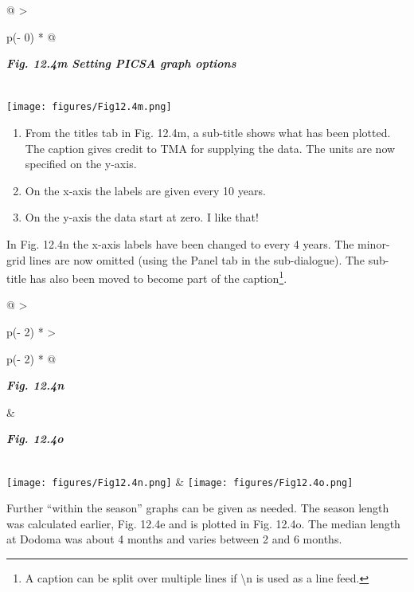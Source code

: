 \documentclass[
  letterpaper,
  DIV=11,
  numbers=noendperiod]{scrreprt}
\begin{document}
\begin{longtable}[]{@{}
  >{\raggedright\arraybackslash}p{(\columnwidth - 0\tabcolsep) * }@{}}
\toprule\noalign{}
\begin{minipage}[b]{\linewidth}\raggedright
\textbf{\emph{Fig. 12.4m Setting PICSA graph options}}
\end{minipage} \\
\midrule\noalign{}
\endhead
\bottomrule\noalign{}
\endlastfoot
\texttt{[image: figures/Fig12.4m.png]} \\
\end{longtable}

\begin{enumerate}
\def\labelenumi{\arabic{enumi})}
\item
  From the titles tab in Fig. 12.4m, a sub-title shows what has been
  plotted. The caption gives credit to TMA for supplying the data. The
  units are now specified on the y-axis.
\item
  On the x-axis the labels are given every 10 years.
\item
  On the y-axis the data start at zero. I like that!
\end{enumerate}

In Fig. 12.4n the x-axis labels have been changed to every 4 years. The
minor-grid lines are now omitted (using the Panel tab in the
sub-dialogue). The sub-title has also been moved to become part of the
caption\footnote{A caption can be split over multiple lines if
  \textbackslash n is used as a line feed.}.

\begin{longtable}[]{@{}
  >{\raggedright\arraybackslash}p{(\columnwidth - 2\tabcolsep) * }
  >{\raggedright\arraybackslash}p{(\columnwidth - 2\tabcolsep) * }@{}}
\toprule\noalign{}
\begin{minipage}[b]{\linewidth}\raggedright
\textbf{\emph{Fig. 12.4n}}
\end{minipage} & \begin{minipage}[b]{\linewidth}\raggedright
\textbf{\emph{Fig. 12.4o}}
\end{minipage} \\
\midrule\noalign{}
\endhead
\bottomrule\noalign{}
\endlastfoot
\texttt{[image: figures/Fig12.4n.png]}
&
\texttt{[image: figures/Fig12.4o.png]} \\
\end{longtable}

Further ``within the season'' graphs can be given as needed. The season
length was calculated earlier, Fig. 12.4e and is plotted in Fig. 12.4o.
The median length at Dodoma was about 4 months and varies between 2 and
6 months.
\end{document}
